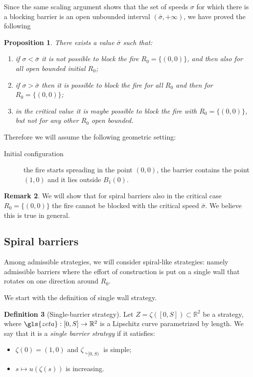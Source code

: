 \documentclass[reqno]{amsart}
\newcounter{assu}
\theoremstyle{definition} \newtheorem{definition}{Definition}[section]
\theoremstyle{definition} \newtheorem{remark}[definition]{Remark}
\theoremstyle{plain} \newtheorem{lemma}[definition]{Lemma}
\theoremstyle{plain} \newtheorem{proposition}[definition]{Proposition}
\theoremstyle{plain} \newtheorem{theorem}[definition]{Theorem}
\theoremstyle{plain} \newtheorem{corollary}[definition]{Corollary}
\theoremstyle{definition} \newtheorem{example}[definition]{Example}
\theoremstyle{plain} \newtheorem{claim}[clai]{Claim}
\theoremstyle{definition} \newtheorem{assumption}[definition]{Assumption}
\theoremstyle{definition} \newtheorem{observation}[definition]{Observation}
\newcommand{\R}{\mathbb{R}}
\newcommand{\1}{\mathbbm 1}
\newcommand{\rest}{\llcorner}
\numberwithin{equation}{section} %
\theoremstyle{plain} \newtheorem*{theorem*}{Theorem}
\theoremstyle{plain} \newtheorem{mthm}[maintheorem]{Main Theorem}
\theoremstyle{plain} \newtheorem*{mthm*}{Main Theorem}
\theoremstyle{plain} \newtheorem*{conjecture*}{Conjecture}
\theoremstyle{plain} \newtheorem{conjecture}[definition]{Conjecture}
\theoremstyle{plain} \newtheorem*{problem*}{Problem}
\begin{document}
Since the same scaling argument shows that the set of speeds $\sigma$ for which there is a blocking barrier is an open unbounded interval $(\bar \sigma,+\infty)$, we have proved the following

\begin{proposition}
\label{Prop:limit_speed}
There exists a value $\bar \sigma$ such that:
\begin{enumerate}
\item if $\sigma < \bar \sigma$ it is not possible to block the fire $R_0 = \{(0,0)\}$, and then also for all open bounded initial $R_0$;
\item if $\sigma > \bar \sigma$ then it is possible to block the fire for all $R_0$ and then for $R_0 = \{(0,0)\}$;
\item in the critical value it is maybe possible to block the fire with $R_0 = \{(0,0)\}$, but not for any other $R_0$ open bounded.
\end{enumerate}
\end{proposition}

Therefore we will assume the following geometric setting:
\begin{description}
\item[Initial configuration] the fire starts spreading in the point $(0,0)$, the barrier contains the point $(1,0)$ and it lies outside $B_1(0)$.
\end{description}

\begin{remark}
\label{Rem:critical_value_origin}
We will show that for spiral barriers also in the critical case $R_0 = \{(0,0)\}$ the fire cannot be blocked with the critical speed $\bar \sigma$. We believe this is true in general.
\end{remark}


\subsection{Spiral barriers}
\label{Ss:spiral_barrier_intro}


Among admissible strategies, we will consider spiral-like strategies: namely admissible barriers where the effort of construction is put on a single wall that rotates on one direction around $R_0$.

We start with the definition of single wall strategy.

\begin{definition}[Single-barrier strategy]\label{def:spiral:strategy}
Let $Z=\zeta([0,S])\subset\R^2$ be a strategy, where  $\gls{zeta} : [0,S] \to \R^2$ is a Lipschitz curve parametrized by length. We say that it is a \emph{single barrier strategy} if it satisfies:
\begin{itemize}
\item $\zeta(0) = (1,0)$ and $\zeta \rest_{[0,S)}$ is simple;

\item $s \mapsto u(\zeta(s))$ is increasing.
\end{itemize}
\end{definition}
\end{document}
